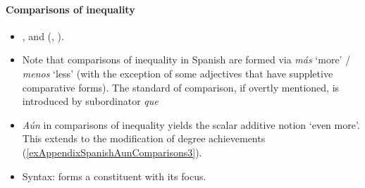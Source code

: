 \paragraph{Comparisons of inequality}
\label{appendixSpanishAunComparatives}
\begin{itemize}
	\item \textcite[565]{FuentesRodriguez2018}, \textcite{Cid1999} and \citeauthor{RAEGramatica} (\citeyear[§30.8r]{RAEGramatica}, \citeyear[s.v. \textit{aun}]{RAEDictionary}).
	\item Note that comparisons of inequality in Spanish are formed via \textit{más} \lq more' / \textit{menos} \lq less' (with the exception of some adjectives that have suppletive comparative forms). The standard of comparison, if overtly mentioned, is  introduced by subordinator \textit{que} \parencite[ch. 45]{RAEGramatica} 	
	\item \textit{Aún} in comparisons of inequality yields the scalar additive notion \lq even more\rq{}. This extends to the modification of degree achievements (\ref{exAppendixSpanishAunComparisons3}).
	\item Syntax: forms a constituent with its focus.
\end{itemize}
